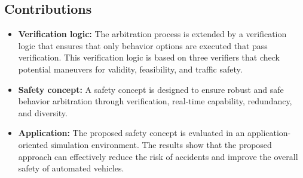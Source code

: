 \subsection{Contributions}

\begin{itemize}
    \item \textbf{Verification logic:} The arbitration process is extended by a verification logic that ensures that only behavior options are executed that pass verification. This verification logic is based on three verifiers that check potential maneuvers for validity, feasibility, and traffic safety.
    \item \textbf{Safety concept:} A safety concept is designed to ensure robust and safe behavior arbitration through verification, real-time capability, redundancy, and diversity.
    \item \textbf{Application:} The proposed safety concept is evaluated in an application-oriented simulation environment. The results show that the proposed approach can effectively reduce the risk of accidents and improve the overall safety of automated vehicles.
\end{itemize}
